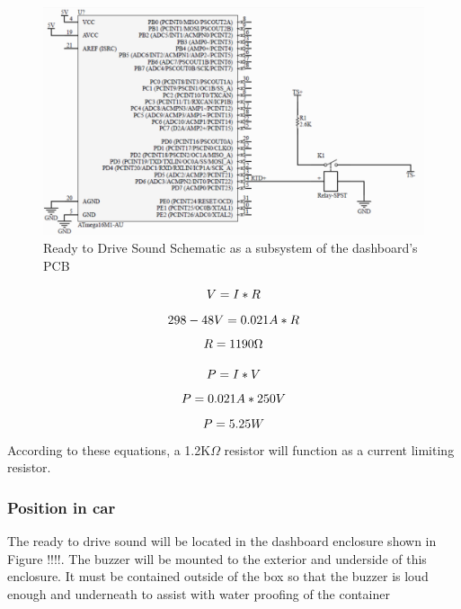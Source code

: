 \documentclass{article}
\begin{document}
\begin{figure}[h]
	\includegraphics[width=\linewidth]{Schematic}
	\caption{Ready to Drive Sound Schematic as a subsystem of the dashboard's PCB}
\end{figure}
	\begin{equation}
		\centering
		V=I*R
	\end{equation}
	\begin{equation}
		\centering
		298-48V=0.021A*R
	\end{equation}
	\begin{equation}
		\centering
		R=1190\Omega
	\end{equation}

	\begin{equation}
		\centering
		P=I*V
	\end{equation}
	\begin{equation}
		\centering
		P=0.021A*250V
	\end{equation}
	\begin{equation}
		\centering
		P=5.25W
	\end{equation}
According to these equations, a 1.2K$\Omega$ resistor will function as a current limiting resistor.
\subsubsection{Position in car}
The ready to drive sound will be located in the dashboard enclosure shown in Figure !!!!. The buzzer will be mounted
to the exterior and underside of this enclosure. It must be contained outside of the box so that the buzzer is
loud enough and underneath to assist with water proofing of the container
\end{document}
